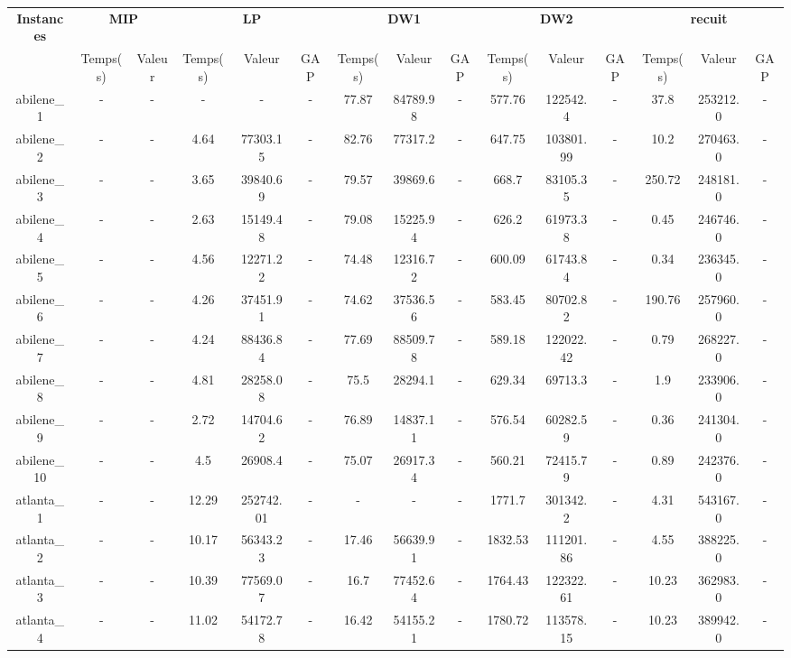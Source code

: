 \documentclass[main.tex]{subfiles}
\begin{document}
\thispagestyle{empty}

\begin{landscape}
\begin{table}[h]
    \centering
    \begin{tabular}{c|cc|ccc|ccc|ccc|ccc}
	\hline	
	\textbf{Instances} &\multicolumn{2}{c}{\textbf{MIP}} &\multicolumn{3}{c}{\textbf{LP}} &\multicolumn{3}{c}{\textbf{DW1}} &\multicolumn{3}{c}{\textbf{DW2}} &\multicolumn{3}{c}{\textbf{recuit}}\\
	 &Temps(s) &Valeur &Temps(s) &Valeur &GAP &Temps(s) &Valeur &GAP &Temps(s) &Valeur &GAP &Temps(s) &Valeur &GAP\\

	\hline
	abilene\_1 &- &- &- &- &- &77.87 &84789.98 &- &577.76 &122542.4 &- &37.8 &253212.0 &-\\
	abilene\_2 &- &- &4.64 &77303.15 &- &82.76 &77317.2 &- &647.75 &103801.99 &- &10.2 &270463.0 &-\\
	abilene\_3 &- &- &3.65 &39840.69 &- &79.57 &39869.6 &- &668.7 &83105.35 &- &250.72 &248181.0 &-\\
	abilene\_4 &- &- &2.63 &15149.48 &- &79.08 &15225.94 &- &626.2 &61973.38 &- &0.45 &246746.0 &-\\
	abilene\_5 &- &- &4.56 &12271.22 &- &74.48 &12316.72 &- &600.09 &61743.84 &- &0.34 &236345.0 &-\\
	abilene\_6 &- &- &4.26 &37451.91 &- &74.62 &37536.56 &- &583.45 &80702.82 &- &190.76 &257960.0 &-\\
	abilene\_7 &- &- &4.24 &88436.84 &- &77.69 &88509.78 &- &589.18 &122022.42 &- &0.79 &268227.0 &-\\
	abilene\_8 &- &- &4.81 &28258.08 &- &75.5 &28294.1 &- &629.34 &69713.3 &- &1.9 &233906.0 &-\\
	abilene\_9 &- &- &2.72 &14704.62 &- &76.89 &14837.11 &- &576.54 &60282.59 &- &0.36 &241304.0 &-\\
	abilene\_10 &- &- &4.5 &26908.4 &- &75.07 &26917.34 &- &560.21 &72415.79 &- &0.89 &242376.0 &-\\
	atlanta\_1 &- &- &12.29 &252742.01 &- &- &- &- &1771.7 &301342.2 &- &4.31 &543167.0 &-\\
	atlanta\_2 &- &- &10.17 &56343.23 &- &17.46 &56639.91 &- &1832.53 &111201.86 &- &4.55 &388225.0 &-\\
	atlanta\_3 &- &- &10.39 &77569.07 &- &16.7 &77452.64 &- &1764.43 &122322.61 &- &10.23 &362983.0 &-\\
	atlanta\_4 &- &- &11.02 &54172.78 &- &16.42 &54155.21 &- &1780.72 &113578.15 &- &10.23 &389942.0 &-\\

\end{tabular}
\end{table}
\end{landscape}
\end{document}
